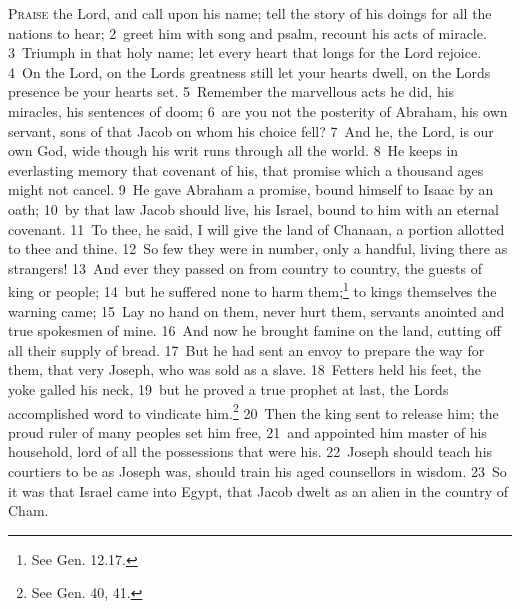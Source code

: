 \documentclass[10pt]{book} %
\begin{document}
\lettrine[lines=2]{P}{raise} the Lord, and call upon his name; tell the story of his doings for all the nations to hear; \textcolor{benred8}{2}~greet him with song and psalm, recount his acts of miracle. \textcolor{benred8}{3}~Triumph in that holy name; let every heart that longs for the Lord rejoice. \textcolor{benred8}{4}~On the Lord, on the Lord\textquotesingle s greatness still let your hearts dwell, on the Lord\textquotesingle s presence be your hearts set. \textcolor{benred8}{5}~Remember the marvellous acts he did, his miracles, his sentences of doom; \textcolor{benred8}{6}~are you not the posterity of Abraham, his own servant, sons of that Jacob on whom his choice fell? \textcolor{benred8}{7}~And he, the Lord, is our own God, wide though his writ runs through all the world. \textcolor{benred8}{8}~He keeps in everlasting memory that covenant of his, that promise which a thousand ages might not cancel. \textcolor{benred8}{9}~He gave Abraham a promise, bound himself to Isaac by an oath; \textcolor{benred8}{10}~by that law Jacob should live, his Israel, bound to him with an eternal covenant. \textcolor{benred8}{11}~To thee, he said, I will give the land of Chanaan, a portion allotted to thee and thine. \textcolor{benred8}{12}~So few they were in number, only a handful, living there as strangers! \textcolor{benred8}{13}~And ever they passed on from country to country, the guests of king or people; \textcolor{benred8}{14}~but he suffered none to harm them;\footnote[1]{See Gen. 12.17.} to kings themselves the warning came; \textcolor{benred8}{15}~Lay no hand on them, never hurt them, servants anointed and true spokesmen of mine.
\textcolor{benred8}{16}~And now he brought famine on the land, cutting off all their supply of bread. \textcolor{benred8}{17}~But he had sent an envoy to prepare the way for them, that very Joseph, who was sold as a slave. \textcolor{benred8}{18}~Fetters held his feet, the yoke galled his neck, \textcolor{benred8}{19}~but he proved a true prophet at last, the Lord\textquotesingle s accomplished word to vindicate him.\footnote[2]{See Gen. 40, 41.} \textcolor{benred8}{20}~Then the king sent to release him; the proud ruler of many peoples set him free, \textcolor{benred8}{21}~and appointed him master of his household, lord of all the possessions that were his. \textcolor{benred8}{22}~Joseph should teach his courtiers to be as Joseph was, should train his aged counsellors in wisdom. \textcolor{benred8}{23}~So it was that Israel came into Egypt, that Jacob dwelt as an alien in the country of Cham.
\end{document}

